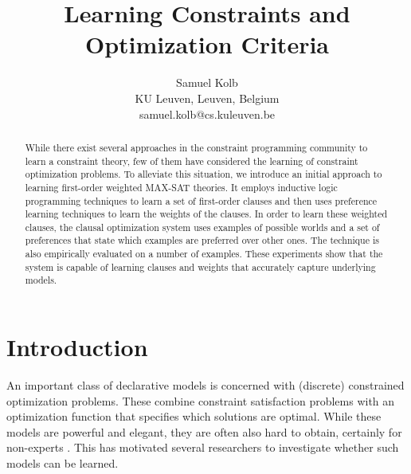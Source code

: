 \documentclass[letterpaper]{article}
\theoremstyle{definition}
\newcommand{\sam}[1]{{\color{red}(#1)}}
\begin{document}
\title{Learning Constraints and Optimization Criteria}
\author{
  Samuel Kolb\\
  KU Leuven, Leuven, Belgium\\
  samuel.kolb@cs.kuleuven.be
}

\maketitle

\begin{abstract}
While there exist several approaches in the constraint programming community to learn a constraint theory, few of them have considered the learning of constraint optimization problems.
To alleviate this situation, we introduce an initial approach to learning first-order weighted MAX-SAT theories. 
It employs inductive logic programming techniques to learn a set of first-order clauses and then uses preference learning techniques to learn the weights of the clauses.
In order to learn these weighted clauses, the clausal optimization system uses examples of possible worlds and a set of preferences that state which examples are preferred over other ones.
The technique is also empirically evaluated on a number of examples.
These experiments show that the system is capable of learning clauses and weights that accurately capture underlying models.
\end{abstract}



\section{Introduction}
An important class of declarative models is concerned with (discrete) constrained optimization problems.
These combine constraint satisfaction problems with an optimization function that specifies which solutions are optimal.
While these models are powerful and elegant, they are often also hard to obtain, certainly for non-experts \cite{Wallace:PrinciplesCP}.
This has motivated several researchers to investigate whether such models can be learned. 
\end{document}
